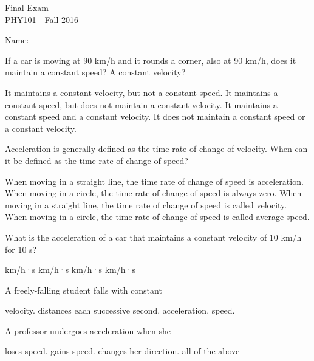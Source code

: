 \documentclass{exam}
\begin{document}
\begin{center}
  Final Exam\\

  PHY101 - Fall 2016\\
\end{center}
Name:\\

\begin{questions}

\question If a car is moving at 90 km/h and it rounds a corner, also at 90 km/h, does it maintain a constant speed? A constant velocity?
\begin{choices}
  \choice It maintains a constant velocity, but not a constant speed.
  \choice It maintains a constant speed, but does not maintain a constant velocity.
  \choice It maintains a constant speed and a constant velocity.
  \choice It does not maintain a constant speed or a constant velocity.
\end{choices}
\vfill{}

\question Acceleration is generally defined as the time rate of change of velocity. When can it be defined as the time rate of change of speed?
\begin{choices}
  \choice When moving in a straight line, the time rate of change of speed is acceleration.
  \choice When moving in a circle, the time rate of change of speed is always zero.
  \choice When moving in a straight line, the time rate of change of speed is called velocity.
  \choice When moving in a circle, the time rate of change of speed is called average speed.
\end{choices}
\vfill{}

\question What is the acceleration of a car that maintains a constant velocity of 10 km/h for 10 s?
\begin{choices}
   km/h·s
   km/h·s
   km/h·s
   km/h·s
\end{choices}
\vfill{}

\question A freely-falling student falls with constant
\begin{choices}
  \choice velocity.
  \choice distances each successive second.
  \choice acceleration.
  \choice speed.
\end{choices}
\vfill{}

\question A professor undergoes acceleration when she
\begin{choices}
  \choice loses speed.
  \choice gains speed.
  \choice changes her direction.
  \choice all of the above
\end{choices}
\vfill{}


\end{questions}
\end{document}
